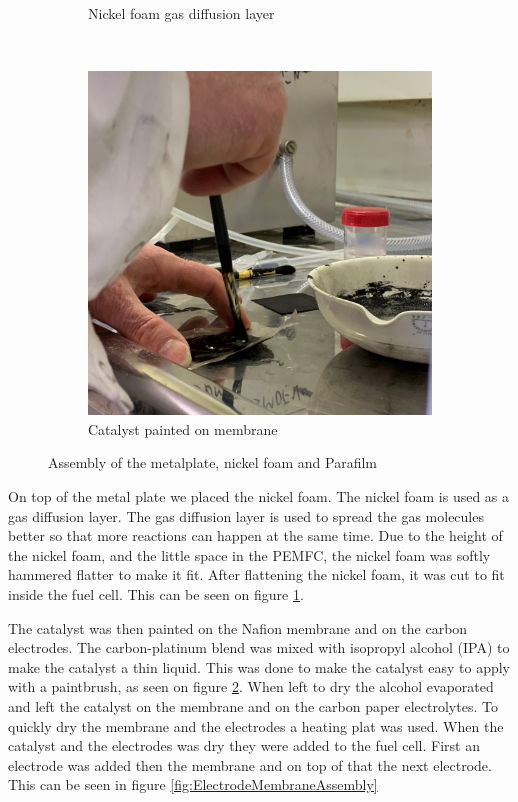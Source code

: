 \begin{figure}[ht]
\begin{subfigure}[b]{0.3\textwidth}
        \caption{Nickel foam gas diffusion layer}
        \label{fig:NickelFoam}
    \end{subfigure}
    ~ %
    \begin{subfigure}[b]{0.3\textwidth}
        \includegraphics[width=\textwidth]{DIV./Bilder/Assembly/Ass3.jpg}
        \caption{Catalyst painted on membrane}
        \label{fig:CatalystPaint}
    \end{subfigure}
    \caption{Assembly of the metalplate, nickel foam and Parafilm}\label{fig:Assembly1}
\end{figure}

On top of the metal plate we placed the nickel foam. The nickel foam is used as a gas diffusion layer. The gas diffusion layer is used to spread the gas molecules better so that more reactions can happen at the same time. Due to the height of the nickel foam, and the little space in the PEMFC, the nickel foam was softly hammered flatter to make it fit. After flattening the nickel foam, it was cut to fit inside the fuel cell. This can be seen on figure \ref{fig:NickelFoam}.

The catalyst was then painted on the Nafion membrane and on the carbon electrodes. The carbon-platinum blend was mixed with isopropyl alcohol (IPA) to make the catalyst a thin liquid. This was done to make the catalyst easy to apply with a paintbrush, as seen on figure \ref{fig:CatalystPaint}. When left to dry the alcohol evaporated and left the catalyst on the membrane and on the carbon paper electrolytes. To quickly dry the membrane and the electrodes a heating plat was used. When the catalyst and the electrodes was dry they were added to the fuel cell. First an electrode was added then the membrane and on top of that the next electrode. This can be seen in figure \ref{fig:ElectrodeMembraneAssembly}


